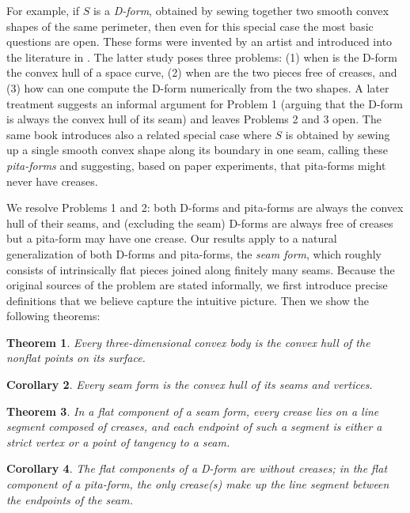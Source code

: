 \documentclass{article}
\newtheorem{theorem}{Theorem}
\newtheorem{corollary}[theorem]{Corollary}
\begin{document}
For example, if $S$ is a \emph{D-form}, obtained by sewing together
two smooth convex shapes of the same perimeter, then even for this
special case the most basic questions are open.  These forms were
invented by an artist \cite{Wills} and introduced into the literature
in \cite{PW}.  The latter study poses three
problems: (1) when is the D-form the convex hull of a space curve, (2)
when are the two pieces free of creases, and (3) how can one compute the
D-form numerically from the two shapes.  A later treatment
\cite{GFALOP} suggests an informal argument for Problem 1 (arguing
that the D-form is always the convex hull of its seam) and leaves
Problems 2 and 3 open.  The same book \cite{GFALOP} introduces also a related
special case where $S$ is obtained by sewing up a single smooth convex
shape along its boundary in one seam, calling these \emph{pita-forms}
and suggesting, based on paper experiments, that pita-forms might never
have creases.

We resolve Problems 1 and 2: both D-forms and pita-forms are always
the convex hull of their seams, and (excluding the seam) D-forms are
always free of creases but a pita-form may have one crease.  Our
results apply to a natural generalization of both D-forms and
pita-forms, the \emph{seam form}, which
roughly consists of intrinsically flat pieces joined along finitely many
seams.  Because the original sources of the problem are stated
informally, we first introduce precise definitions that we believe
capture the intuitive picture.  Then we show the following theorems:

\begin{theorem}\label{t:convex-hull-general}
  Every three-dimensional convex body is the convex hull of the
  nonflat points on its surface.
\end{theorem}

\begin{corollary}\label{c:convex-hull-seam-form}
  Every seam form is the convex hull of its seams and vertices.
\end{corollary}

\begin{theorem}\label{t:no-creases-seam-form}
  In a flat component of a seam form, every crease lies on a line
  segment composed of creases, and each endpoint of such a segment is
  either a strict vertex or a point of tangency to a seam.
\end{theorem}

\begin{corollary}\label{c:no-creases-d-form}
  The flat components of a D-form are without creases; in the flat
  component of a pita-form, the only crease(s) make up the line
  segment between the endpoints of the seam.
\end{corollary}
\end{document}
